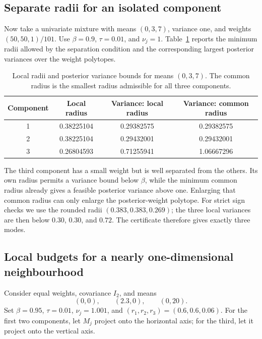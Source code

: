 \documentclass[12pt,a4paper]{article}
\theoremstyle{remark}
\begin{document}
\subsection{Separate radii for an isolated component}

Now take a univariate mixture with means $(0,3,7)$, variance one, and weights $(50,50,1)/101$. Use $\beta=0.9$, $\tau=0.01$, and $\nu_j=1$. Table~\ref{tab:radii} reports the minimum radii allowed by the separation condition and the corresponding largest posterior variances over the weight polytopes.

\begin{table}[htbp]
\centering
\doublespacing
\caption{Local radii and posterior variance bounds for means $(0,3,7)$. The common radius is the smallest radius admissible for all three components.}
\label{tab:radii}
\begin{tabular}{cccc}
\toprule
Component & Local radius & Variance: local radius & Variance: common radius\\
\midrule
1 & 0.38225104 & 0.29382575 & 0.29382575\\
2 & 0.38225104 & 0.29432001 & 0.29432001\\
3 & 0.26804593 & 0.71255941 & 1.06667296\\
\bottomrule
\end{tabular}
\end{table}

The third component has a small weight but is well separated from the others. Its own radius permits a variance bound below $\beta$, while the minimum common radius already gives a feasible posterior variance above one. Enlarging that common radius can only enlarge the posterior-weight polytope. For strict sign checks we use the rounded radii $(0.383,0.383,0.269)$; the three local variances are then below $0.30$, $0.30$, and $0.72$. The certificate therefore gives exactly three modes.

\subsection{Local budgets for a nearly one-dimensional neighbourhood}

Consider equal weights, covariance $I_2$, and means
\[
 (0,0),\qquad(2.3,0),\qquad(0,20).
\]
Set $\beta=0.95$, $\tau=0.01$, $\nu_j=1.001$, and
$(r_1,r_2,r_3)=(0.6,0.6,0.06)$. For the first two components, let $M_j$ project onto the horizontal axis; for the third, let it project onto the vertical axis.
\end{document}
